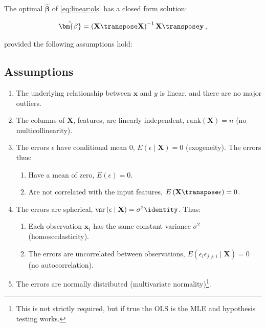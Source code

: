 \noindent The optimal $\hat{\bm{\beta}}$ of \cref{eq:linear:ols} has a closed form solution:

\begin{equation}\label{eq:linear:betahat}
\hat{\bm{\beta}} = \left(\mathbf{X}\transpose\mathbf{X}\right)^{-1}\mathbf{X}\transpose \mathbf{y}\,,
\end{equation}

\noindent provided the following assumptions hold:

\subsection{Assumptions}
\label{regression:linear:assumptions}

\begin{enumerate}[noitemsep]
\item The underlying relationship between $\mathbf{x}$ and $y$ is linear, and there are no major outliers.\label{item:regression:linear:linear}
\item The columns of $\mathbf{X}$, \ie features, are linearly independent, \ie $\mathrm{rank}\left(\mathbf{X}\right) = n$ (no multicollinearity).\label{item:regression:linear:multicollinearity}
\item The errors $\epsilon$ have conditional mean 0, $E\left(\epsilon \mid \mathbf{X}\right) = 0$ (exogeneity). The errors thus:\label{item:regression:linear:exogeneity}
\begin{enumerate}[noitemsep]
\item Have a mean of zero, $E\left(\epsilon\right) = 0$.
\item Are not correlated with the input features, $E\left(\mathbf{X}\transpose\epsilon\right) = 0$.
\end{enumerate}
\item The errors are spherical, $\mathrm{var}\left(\epsilon \mid \mathbf{X}\right) = \sigma^{2} \identity$. Thus:\label{item:regression:linear:spherical}
\begin{enumerate}[noitemsep]
\item Each observation $\mathbf{x}_{i}$ has the same constant variance $\sigma^{2}$ (homoscedasticity).
\item The errors are uncorrelated between observations, $E\left(\epsilon_{i}\epsilon_{j \neq i} \mid \mathbf{X}\right) = 0$ (no autocorrelation).
\end{enumerate}
\item The errors are normally distributed (multivariate normality)\footnote{This is not strictly required, but if true the OLS is the MLE and hypothesis testing works.}.\label{item:regression:linear:normality}
\end{enumerate}

